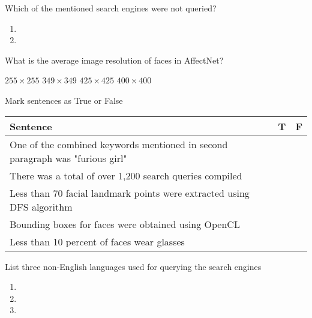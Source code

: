 \begin{questions}

	\question[1] Which of the mentioned search engines were not queried?
	\begin{enumerate}
		\item \enspace\hrulefill
		\item \enspace\hrulefill
	\end{enumerate}

	\question[1] What is the average image resolution of faces in AffectNet?
	\begin{checkboxes}
		\choice $255 \times 255$
		\choice $349 \times 349$
		\choice $425 \times 425$
		\choice $400 \times 400$
	\end{checkboxes}

	\question[5] Mark sentences as True or False

	\begin{tabular}{|l|l|l|}
		\hline
		\textbf{Sentence} & \textbf{T} & \textbf{F} \\ \hline
		One of the combined keywords mentioned in second paragraph was "furious girl" & & \\ \hline
		There was a total of over 1,200 search queries compiled & & \\ \hline
		Less than 70 facial landmark points were extracted using DFS algorithm & & \\\hline
		Bounding boxes for faces were obtained using OpenCL & & \\ \hline
		Less than 10 percent of faces wear glasses & & \\\hline
	\end{tabular}

	\question[3] List three non-English languages used for querying the search engines
	\begin{enumerate}
		\item \enspace\hrulefill
		\item \enspace\hrulefill
		\item \enspace\hrulefill
	\end{enumerate}

\end{questions}

\begin{center}
	\gradetable[h][questions]
\end{center}

